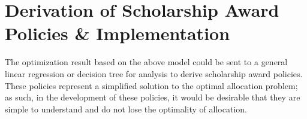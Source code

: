 \documentclass[12pt,english]{report}
\begin{document}

\chapter{Derivation of Scholarship Award Policies \& Implementation}

The optimization result based on the above model could be sent to a general linear regression or decision tree for analysis to derive scholarship award policies.  These policies represent a simplified solution to the optimal allocation problem; as such, in the development of these policies, it would be desirable that they are simple to understand and do not lose the optimality of allocation. 
\end{document}
